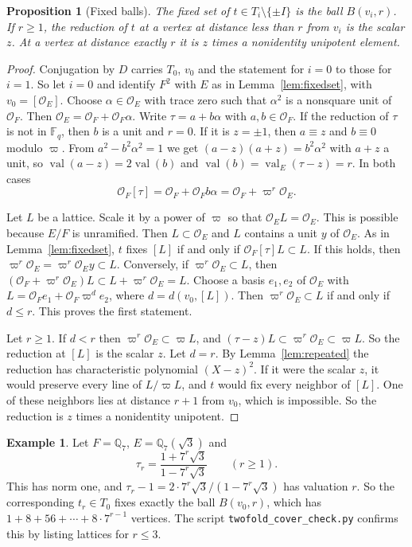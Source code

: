 \documentclass[12pt,letterpaper]{article}
\numberwithin{equation}{section}
\newtheorem{proposition}[theorem]{Proposition}
\theoremstyle{definition}
\newtheorem{example}[theorem]{Example}
\theoremstyle{remark}
\newcommand{\OO}{\mathcal O_F}
\newcommand{\OEr}{\mathcal O_E}
\newcommand{\kk}{\mathbb F_q}
\newcommand{\val}{\operatorname{val}}
\begin{document}
\begin{proposition}[Fixed balls]\label{prop:ball}
The fixed set of $t\in T_i\setminus\{\pm I\}$ is the ball $B(v_i,r)$. If $r\ge1$, the reduction of $t$ at a vertex at distance less than $r$ from $v_i$ is the scalar $z$. At a vertex at distance exactly $r$ it is $z$ times a nonidentity unipotent element.
\end{proposition}
\begin{proof}
Conjugation by $D$ carries $T_0$, $v_0$ and the statement for $i=0$ to those for $i=1$. So let $i=0$ and identify $F^2$ with $E$ as in Lemma~\ref{lem:fixedset}, with $v_0=[\OEr]$. Choose $\alpha\in\OEr$ with trace zero such that $\alpha^2$ is a nonsquare unit of $\OO$. Then $\OEr=\OO+\OO\alpha$. Write $\tau=a+b\alpha$ with $a,b\in\OO$. If the reduction of $\tau$ is not in $\kk$, then $b$ is a unit and $r=0$. If it is $z=\pm1$, then $a\equiv z$ and $b\equiv0$ modulo $\varpi$. From $a^2-b^2\alpha^2=1$ we get $(a-z)(a+z)=b^2\alpha^2$ with $a+z$ a unit, so $\val(a-z)=2\val(b)$ and $\val(b)=\val_E(\tau-z)=r$. In both cases
\[
 \OO[\tau]=\OO+\OO b\alpha=\OO+\varpi^r\OEr .
\]

Let $L$ be a lattice. Scale it by a power of $\varpi$ so that $\OEr L=\OEr$. This is possible because $E/F$ is unramified. Then $L\subset\OEr$ and $L$ contains a unit $y$ of $\OEr$. As in Lemma~\ref{lem:fixedset}, $t$ fixes $[L]$ if and only if $\OO[\tau]L\subset L$. If this holds, then $\varpi^r\OEr=\varpi^r\OEr y\subset L$. Conversely, if $\varpi^r\OEr\subset L$, then $(\OO+\varpi^r\OEr)L\subset L+\varpi^r\OEr=L$. Choose a basis $e_1,e_2$ of $\OEr$ with $L=\OO e_1+\OO\varpi^de_2$, where $d=d(v_0,[L])$. Then $\varpi^r\OEr\subset L$ if and only if $d\le r$. This proves the first statement.

Let $r\ge1$. If $d<r$ then $\varpi^r\OEr\subset\varpi L$, and $(\tau-z)L\subset\varpi^r\OEr\subset\varpi L$. So the reduction at $[L]$ is the scalar $z$. Let $d=r$. By Lemma~\ref{lem:repeated} the reduction has characteristic polynomial $(X-z)^2$. If it were the scalar $z$, it would preserve every line of $L/\varpi L$, and $t$ would fix every neighbor of $[L]$. One of these neighbors lies at distance $r+1$ from $v_0$, which is impossible. So the reduction is $z$ times a nonidentity unipotent.
\end{proof}

\begin{example}\label{ex:tr}
Let $F=\mathbb Q_7$, $E=\mathbb Q_7(\sqrt3)$ and
\[
 \tau_r=\frac{1+7^r\sqrt3}{1-7^r\sqrt3}\qquad(r\ge1).
\]
This has norm one, and $\tau_r-1=2\cdot7^r\sqrt3/(1-7^r\sqrt3)$ has valuation $r$. So the corresponding $t_r\in T_0$ fixes exactly the ball $B(v_0,r)$, which has $1+8+56+\cdots+8\cdot7^{r-1}$ vertices. The script \texttt{twofold\_cover\_check.py} confirms this by listing lattices for $r\le3$.
\end{example}
\end{document}
